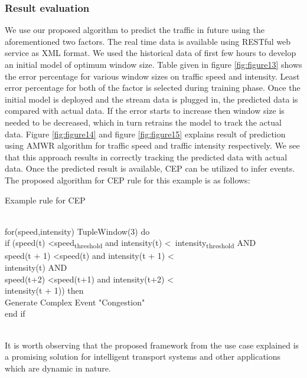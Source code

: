 \documentclass[runningheads]{llncs}
\begin{document}
\subsubsection{Result evaluation} We use our proposed algorithm to predict the traffic in future using the aforementioned two factors. The real time data is available using RESTful web service as XML format. We used the historical data of first few hours to develop an initial model of optimum window size. Table given in figure \ref{fig:figure13} shows the error percentage for various window sizes on traffic speed and intensity. Least error percentage for both of the factor is selected during training phase. Once the initial model is deployed and the stream data is plugged in, the predicted data is compared with actual data. If the error starts to increase then window size is needed to be decreased, which in turn retrains the model to track the actual data.
Figure \ref{fig:figure14} and figure \ref{fig:figure15} explains result of prediction using AMWR algorithm for traffic speed and traffic intensity respectively. We see that this approach results in correctly tracking the predicted data with actual data.
Once the predicted result is available, CEP can be utilized to infer events. The proposed algorithm for CEP rule for this example is as follows: \\
\begin{algorithm} 
	\caption{Example rule for CEP \cite{17}}\label{Example rule for CE}
	\begin{algorithmic}[1]
		\\
		for(speed,intensity) TupleWindow(3) do \\
		if (speed(t) \textless speed\textsubscript{threshold} and intensity(t) \textless \
		intensity\textsubscript{threshold} AND \\
	    speed(t + 1) \textless speed(t) and intensity(t + 1) \textless \\
	    intensity(t) AND \\
	    speed(t+2) \textless speed(t+1) and intensity(t+2) \textless \\
        intensity(t + 1)) then \\
		Generate Complex Event "Congestion" \\
		end if
		\EndProcedure 
	\end{algorithmic}
\end{algorithm}
\\It is worth observing that the proposed framework from the use case explained is a promising solution for intelligent transport systems and other applications which are dynamic in nature. 
\end{document}
